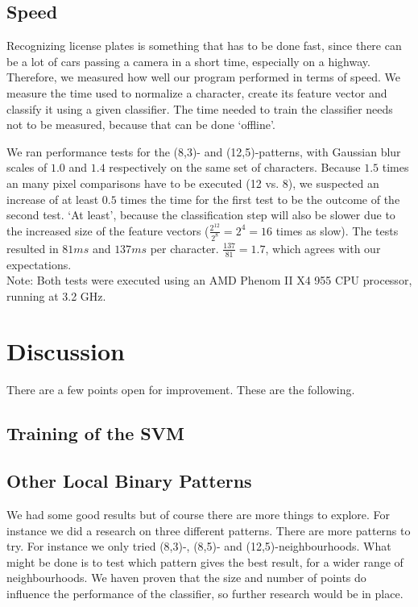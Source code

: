\documentclass[a4paper]{article}
\begin{document}
\subsection{Speed}

Recognizing license plates is something that has to be done fast, since there
can be a lot of cars passing a camera in a short time, especially on a highway.
Therefore, we measured how well our program performed in terms of speed. We
measure the time used to normalize a character, create its feature vector and
classify it using a given classifier. The time needed to train the classifier
needs not to be measured, because that can be done `offline'.

We ran performance tests for the (8,3)- and (12,5)-patterns, with Gaussian blur
scales of $1.0$ and $1.4$ respectively on the same set of characters. Because
$1.5$ times an many pixel comparisons have to be executed (12 vs. 8), we
suspected an increase of at least $0.5$ times the time for the first test to be
the outcome of the second test. `At least', because the classification step
will also be slower due to the increased size of the feature vectors
($\frac{2^{12}}{2^8} = 2^4 = 16$ times as slow). The tests resulted in $81ms$
and $137ms$ per character. $\frac{137}{81} = 1.7$, which agrees with our
expectations. \\
Note: Both tests were executed using an AMD Phenom II X4 955 CPU processor,
running at 3.2 GHz.

\section{Discussion}

There are a few points open for improvement. These are the following.

\subsection{Training of the SVM}



\subsection{Other Local Binary Patterns}

We had some good results but of course there are more things to explore.
For instance we did a research on three different patterns. There are more
patterns to try. For instance we only tried (8,3)-, (8,5)- and
(12,5)-neighbourhoods. What might be done is to test which pattern gives the
best result, for a wider range of neighbourhoods. We haven proven that the size
and number of points do influence the performance of the classifier, so further
research would be in place.
\end{document}
